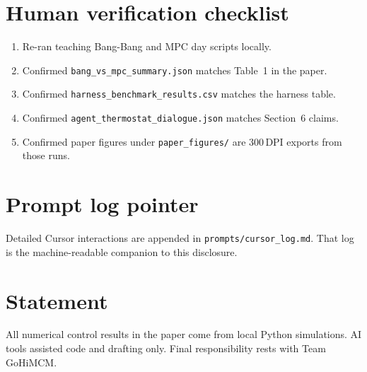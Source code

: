 \documentclass[11pt]{article}
\newcommand{\TeamNumber}{GoHiMCM}
\begin{document}
\section{Human verification checklist}
\begin{enumerate}[leftmargin=1.2em,itemsep=0.25em]
  \item Re-ran teaching Bang-Bang and MPC day scripts locally.
  \item Confirmed \texttt{bang\_vs\_mpc\_summary.json} matches Table~1 in the paper.
  \item Confirmed \texttt{harness\_benchmark\_results.csv} matches the harness table.
  \item Confirmed \texttt{agent\_thermostat\_dialogue.json} matches Section~6 claims.
  \item Confirmed paper figures under \texttt{paper\_figures/} are 300\,DPI exports
        from those runs.
\end{enumerate}

\section{Prompt log pointer}
Detailed Cursor interactions are appended in
\texttt{prompts/cursor\_log.md}.
That log is the machine-readable companion to this disclosure.

\section{Statement}
All numerical control results in the paper come from local Python simulations.
AI tools assisted code and drafting only.
Final responsibility rests with Team \TeamNumber.
\end{document}
